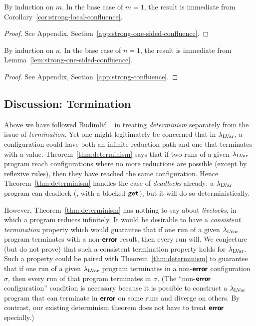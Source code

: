 \LemStrongOneSidedConfluence
\ifx\fulltr\undefined
\begin{proofsketch}
  By induction on $m$.  In the base case of $m = 1$, the
  result is immediate from Corollary~\ref{cor:strong-local-confluence}.
\end{proofsketch}
\else
\begin{proof}
See Appendix, Section~\ref{app:strong-one-sided-confluence}.
\end{proof}
\fi

\LemStrongConfluence
\ifx\fulltr\undefined
\begin{proofsketch}
  By induction on $n$.  In the base case of $n = 1$, the
  result is immediate from Lemma~\ref{lem:strong-one-sided-confluence}.
\end{proofsketch}
\else
\begin{proof}
See Appendix, Section~\ref{app:strong-confluence}.
\end{proof}
\fi

\LemConfluence

\ThmDeterminism

\subsection{Discussion: Termination}

Above we have followed Budimli\'c \etal~\cite{CnC} in treating {\em
  determinism} separately from the issue of {\em termination}.  Yet
one might legitimately be concerned that in $\lambda_{\textrm{LVar}}$, a
configuration could have both an infinite reduction path and one that
terminates with a value.  Theorem~\ref{thm:determinism} says that if two runs of a
given $\lambda_{\textrm{LVar}}$ program reach configurations where no more reductions
are possible (except by reflexive rules), 
then they have reached the same
configuration.  Hence Theorem~\ref{thm:determinism} handles the case of {\em
  deadlocks} already: a $\lambda_{\textrm{LVar}}$ program can deadlock (\eg, with a blocked $\mbox{\texttt{get}}$), but it will do so deterministically.

However, Theorem~\ref{thm:determinism} has nothing to say about {\em
  livelocks}, in which a program reduces infinitely.  It would be
desirable to have a {\em consistent termination} property which
would guarantee that if one run of a given $\lambda_{\textrm{LVar}}$ program terminates
with a non-$\textbf{\textsf{error}}$ result,
then every run will.
We
conjecture (but do not prove) that such a consistent termination property
holds for $\lambda_{\textrm{LVar}}$.
Such a property could be paired with
Theorem~\ref{thm:determinism} to guarantee that if one run of a given
$\lambda_{\textrm{LVar}}$ program terminates in a non-$\textbf{\textsf{error}}$ configuration $\sigma$, then every
run of that program terminates in $\sigma$.
(The ``non-$\textbf{\textsf{error}}$ configuration'' condition is necessary because it
is possible to construct a $\lambda_{\textrm{LVar}}$ program that can terminate in
$\textbf{\textsf{error}}$ on some runs and diverge on others.
By contrast, our existing determinism theorem 
does not have to treat $\textbf{\textsf{error}}$
specially.)

